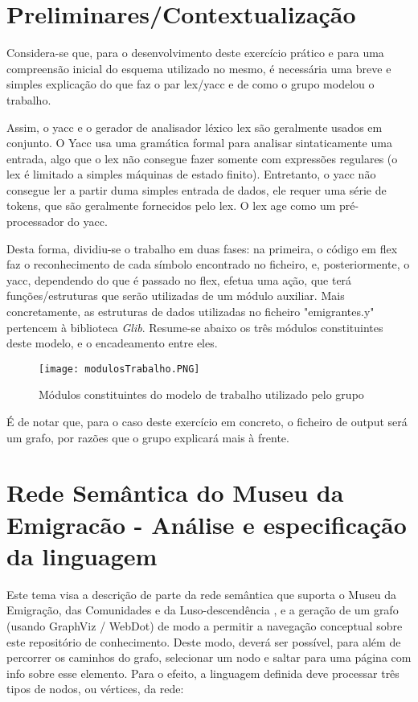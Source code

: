 \documentclass[a4paper]{article}
\begin{document}
\section{Preliminares/Contextualização}
\label{sec:2}
\hspace{3mm} Considera-se que, para o desenvolvimento deste exercício prático e para uma compreensão inicial do esquema utilizado no mesmo, é necessária uma breve e simples explicação do que faz o par lex/yacc e de como o grupo modelou o trabalho.
\par Assim, o yacc e o gerador de analisador léxico lex são geralmente usados em conjunto. O Yacc usa uma gramática formal para analisar sintaticamente uma entrada, algo que o lex não consegue fazer somente com expressões regulares (o lex é limitado a simples máquinas de estado finito). Entretanto, o yacc não consegue ler a partir duma simples entrada de dados, ele requer uma série de tokens, que são geralmente fornecidos pelo lex. O lex age como um pré-processador do yacc.
\par Desta forma, dividiu-se o trabalho em duas fases: na primeira, o código em flex faz o reconhecimento de cada símbolo encontrado no ficheiro, e, posteriormente, o yacc, dependendo do que é passado no flex, efetua uma ação, que terá funções/estruturas que serão utilizadas de um módulo auxiliar. Mais concretamente, as estruturas de dados utilizadas no ficheiro "emigrantes.y" pertencem à biblioteca \emph{Glib}.
Resume-se abaixo os três módulos constituintes deste modelo, e o encadeamento entre eles.

\begin{figure}[H]
\centering
\texttt{[image: modulosTrabalho.PNG]}
\caption{Módulos constituintes do modelo de trabalho utilizado pelo grupo}
\end{figure}

É de notar que, para o caso deste exercício em concreto, o ficheiro de output será um grafo, por razões que o grupo explicará mais à frente.


\pagebreak


\section{Rede Semântica do Museu da Emigracão - Análise e especificação da linguagem}
\label{sec:3}
\hspace{3.5mm} Este tema visa a descrição de parte da rede semântica que suporta o Museu da Emigração, das Comunidades e da Luso-descendência \cite{siteMuseu}, e a geração de um grafo (usando GraphViz / WebDot) de modo a permitir a navegação conceptual sobre este repositório de conhecimento. Deste modo, deverá ser possível, para além de percorrer os caminhos do grafo, selecionar um nodo e saltar para uma página com info sobre esse elemento. Para o efeito, a linguagem definida deve processar três tipos de nodos, ou vértices, da rede:
\end{document}
